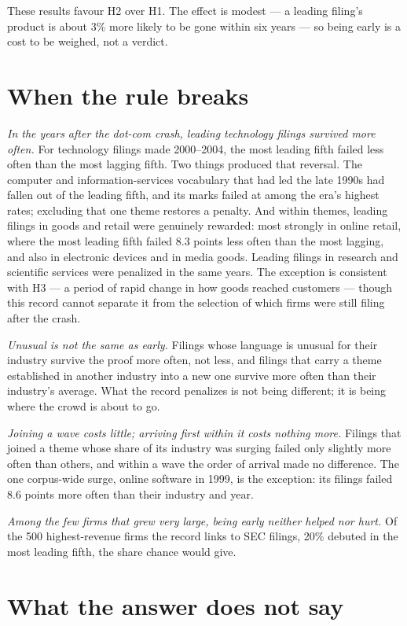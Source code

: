 These results favour H2 over H1. The effect is modest --- a leading
filing's product is about 3\% more likely to be gone within six years
--- so being early is a cost to be weighed, not a verdict.

\section*{When the rule breaks}

\emph{In the years after the dot-com crash, leading technology filings
survived more often.} For technology filings made 2000--2004, the most
leading fifth failed less often than the most lagging fifth. Two things
produced that reversal. The computer and information-services
vocabulary that had led the late 1990s had fallen out of the leading
fifth, and its marks failed at among the era's highest rates; excluding
that one theme restores a penalty. And within themes, leading filings
in goods and retail were genuinely rewarded: most strongly in online
retail, where the most leading fifth failed 8.3 points less often than
the most lagging, and also in electronic devices and in media goods.
Leading filings in research and scientific services were penalized in
the same years. The exception is consistent with H3 --- a period of
rapid change in how goods reached customers --- though this record
cannot separate it from the selection of which firms were still filing
after the crash.

\emph{Unusual is not the same as early.} Filings whose language is
unusual for their industry survive the proof more often, not less, and
filings that carry a theme established in another industry into a new
one survive more often than their industry's average. What the record
penalizes is not being different; it is being where the crowd is about
to go.

\emph{Joining a wave costs little; arriving first within it costs
nothing more.} Filings that joined a theme whose share of its industry
was surging failed only slightly more often than others, and within a
wave the order of arrival made no difference. The one corpus-wide
surge, online software in 1999, is the exception: its filings failed
8.6 points more often than their industry and year.

\emph{Among the few firms that grew very large, being early neither
helped nor hurt.} Of the 500 highest-revenue firms the record links to
SEC filings, 20\% debuted in the most leading fifth, the share chance
would give.

\section*{What the answer does not say}

